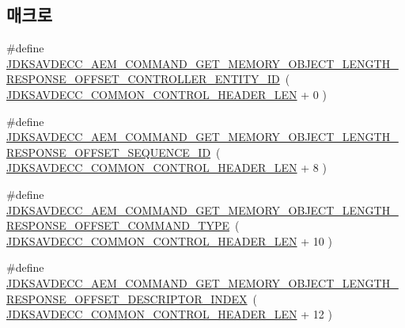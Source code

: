 \subsection*{매크로}
\begin{DoxyCompactItemize}
\item 
\#define \hyperlink{group__command__get__memory__object__length__response_ga6e5cb7a88344267f7688fe8eef99bdd9}{J\+D\+K\+S\+A\+V\+D\+E\+C\+C\+\_\+\+A\+E\+M\+\_\+\+C\+O\+M\+M\+A\+N\+D\+\_\+\+G\+E\+T\+\_\+\+M\+E\+M\+O\+R\+Y\+\_\+\+O\+B\+J\+E\+C\+T\+\_\+\+L\+E\+N\+G\+T\+H\+\_\+\+R\+E\+S\+P\+O\+N\+S\+E\+\_\+\+O\+F\+F\+S\+E\+T\+\_\+\+C\+O\+N\+T\+R\+O\+L\+L\+E\+R\+\_\+\+E\+N\+T\+I\+T\+Y\+\_\+\+ID}~( \hyperlink{group__jdksavdecc__avtp__common__control__header_gaae84052886fb1bb42f3bc5f85b741dff}{J\+D\+K\+S\+A\+V\+D\+E\+C\+C\+\_\+\+C\+O\+M\+M\+O\+N\+\_\+\+C\+O\+N\+T\+R\+O\+L\+\_\+\+H\+E\+A\+D\+E\+R\+\_\+\+L\+EN} + 0 )
\item 
\#define \hyperlink{group__command__get__memory__object__length__response_gafae793998d89f33701b53fcdf42cb328}{J\+D\+K\+S\+A\+V\+D\+E\+C\+C\+\_\+\+A\+E\+M\+\_\+\+C\+O\+M\+M\+A\+N\+D\+\_\+\+G\+E\+T\+\_\+\+M\+E\+M\+O\+R\+Y\+\_\+\+O\+B\+J\+E\+C\+T\+\_\+\+L\+E\+N\+G\+T\+H\+\_\+\+R\+E\+S\+P\+O\+N\+S\+E\+\_\+\+O\+F\+F\+S\+E\+T\+\_\+\+S\+E\+Q\+U\+E\+N\+C\+E\+\_\+\+ID}~( \hyperlink{group__jdksavdecc__avtp__common__control__header_gaae84052886fb1bb42f3bc5f85b741dff}{J\+D\+K\+S\+A\+V\+D\+E\+C\+C\+\_\+\+C\+O\+M\+M\+O\+N\+\_\+\+C\+O\+N\+T\+R\+O\+L\+\_\+\+H\+E\+A\+D\+E\+R\+\_\+\+L\+EN} + 8 )
\item 
\#define \hyperlink{group__command__get__memory__object__length__response_ga8a00d43aa2c90e10f56e56c4539caf0d}{J\+D\+K\+S\+A\+V\+D\+E\+C\+C\+\_\+\+A\+E\+M\+\_\+\+C\+O\+M\+M\+A\+N\+D\+\_\+\+G\+E\+T\+\_\+\+M\+E\+M\+O\+R\+Y\+\_\+\+O\+B\+J\+E\+C\+T\+\_\+\+L\+E\+N\+G\+T\+H\+\_\+\+R\+E\+S\+P\+O\+N\+S\+E\+\_\+\+O\+F\+F\+S\+E\+T\+\_\+\+C\+O\+M\+M\+A\+N\+D\+\_\+\+T\+Y\+PE}~( \hyperlink{group__jdksavdecc__avtp__common__control__header_gaae84052886fb1bb42f3bc5f85b741dff}{J\+D\+K\+S\+A\+V\+D\+E\+C\+C\+\_\+\+C\+O\+M\+M\+O\+N\+\_\+\+C\+O\+N\+T\+R\+O\+L\+\_\+\+H\+E\+A\+D\+E\+R\+\_\+\+L\+EN} + 10 )
\item 
\#define \hyperlink{group__command__get__memory__object__length__response_gab74e1889d28e46983d29b00f824102eb}{J\+D\+K\+S\+A\+V\+D\+E\+C\+C\+\_\+\+A\+E\+M\+\_\+\+C\+O\+M\+M\+A\+N\+D\+\_\+\+G\+E\+T\+\_\+\+M\+E\+M\+O\+R\+Y\+\_\+\+O\+B\+J\+E\+C\+T\+\_\+\+L\+E\+N\+G\+T\+H\+\_\+\+R\+E\+S\+P\+O\+N\+S\+E\+\_\+\+O\+F\+F\+S\+E\+T\+\_\+\+D\+E\+S\+C\+R\+I\+P\+T\+O\+R\+\_\+\+I\+N\+D\+EX}~( \hyperlink{group__jdksavdecc__avtp__common__control__header_gaae84052886fb1bb42f3bc5f85b741dff}{J\+D\+K\+S\+A\+V\+D\+E\+C\+C\+\_\+\+C\+O\+M\+M\+O\+N\+\_\+\+C\+O\+N\+T\+R\+O\+L\+\_\+\+H\+E\+A\+D\+E\+R\+\_\+\+L\+EN} + 12 )

\end{DoxyCompactItemize}
